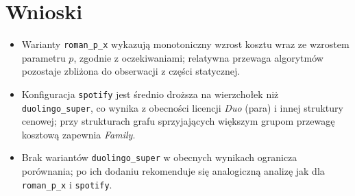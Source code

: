 \section{Wnioski}

\begin{itemize}
  \item Warianty \texttt{roman\_p\_x} wykazują monotoniczny wzrost kosztu wraz ze wzrostem parametru $p$, zgodnie z oczekiwaniami; relatywna przewaga algorytmów pozostaje zbliżona do obserwacji z części statycznej.
  \item Konfiguracja \texttt{spotify} jest średnio droższa na wierzchołek niż \texttt{duolingo\_super}, co wynika z obecności licencji \emph{Duo} (para) i innej struktury cenowej; przy strukturach grafu sprzyjających większym grupom przewagę kosztową zapewnia \emph{Family}.
  \item Brak wariantów \texttt{duolingo\_super} w obecnych wynikach ogranicza porównania; po ich dodaniu rekomenduje się analogiczną analizę jak dla \texttt{roman\_p\_x} i \texttt{spotify}.
\end{itemize}
